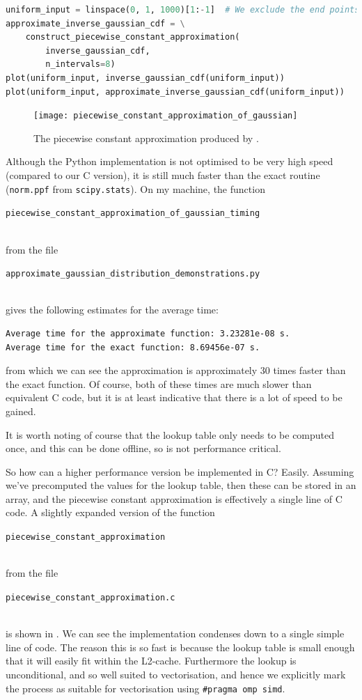 \documentclass[11pt,a4paper,twoside,english]{extarticle}
\newcommand{\singlecodeline}[1]{\\[1em]\centerline{\lstinline[basicstyle=\ttfamily]$#1$}\\[1em]}
\begin{document}
\begin{lstfloat}[htb]
\begin{lstlisting}[language=python, captionpos=b, caption={Comparing the exact and approximate functions.}, label={code:python:plot_piecewise_constant_approximation_of_gaussian}]
uniform_input = linspace(0, 1, 1000)[1:-1]  # We exclude the end points.
approximate_inverse_gaussian_cdf = \
    construct_piecewise_constant_approximation(
        inverse_gaussian_cdf, 
        n_intervals=8)
plot(uniform_input, inverse_gaussian_cdf(uniform_input))
plot(uniform_input, approximate_inverse_gaussian_cdf(uniform_input))
\end{lstlisting}
\end{lstfloat}

\begin{figure}[htb]
\centering
\texttt{[image: piecewise\_constant\_approximation\_of\_gaussian]}
\caption{The piecewise constant approximation produced by .}
\label{fig:piecewise_constant_approximation_of_gaussian}
\end{figure}

Although the Python implementation is not optimised to be very high speed (compared to our C version), it is still much faster than the exact routine (\verb|norm.ppf| from \verb|scipy.stats|). On my machine, the function \singlecodeline{piecewise_constant_approximation_of_gaussian_timing} from the file \singlecodeline{approximate_gaussian_distribution_demonstrations.py} gives the following estimates for the average time:
\begin{verbatim}
Average time for the approximate function: 3.23281e-08 s.
Average time for the exact function: 8.69456e-07 s.
\end{verbatim}
from which we can see the approximation is approximately 30 times faster than the exact function. Of course, both of these times are much slower than equivalent C code, but it is at least indicative that there is a lot of speed to be gained. 


It is worth noting of course that the lookup table only needs to be computed once, and this can be done offline, so is not performance critical. 

So how can a higher performance version be implemented in C? Easily. Assuming we've precomputed the values for the lookup table, then these can be stored in an array, and the piecewise constant approximation is effectively a single line of C code. A slightly expanded version of the function \singlecodeline{piecewise_constant_approximation}
from the file \singlecodeline{piecewise_constant_approximation.c}
is shown in \Cref{code:c:piecewise_constant_approximation}. We can see the implementation condenses down to a single simple line of code. The reason this is so fast is because the lookup table is small enough that it will easily fit within the L2-cache. Furthermore the lookup is unconditional, and so well suited to vectorisation, and hence we explicitly mark the process as suitable for vectorisation using \verb|#pragma omp simd|.
\end{document}
